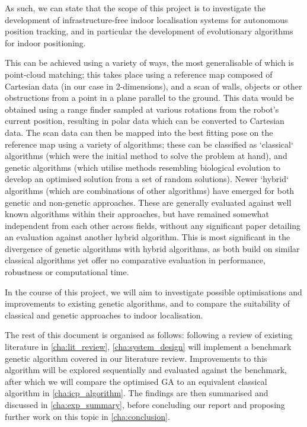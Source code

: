 \documentclass[authoryearcitations]{UoYCSproject}
\begin{document}
As such, we can state that the scope of this project is to investigate the development of infrastructure-free indoor localisation systems for autonomous position tracking, and in particular the development of evolutionary algorithms for indoor positioning.
\newline

This can be achieved using a variety of ways, the most generalisable of which is point-cloud matching; this takes place using a reference map composed of Cartesian data (in our case in 2-dimensions), and a scan of walls, objects or other obstructions from a point in a plane parallel to the ground. This data would be obtained using a range finder sampled at various rotations from the robot's current position, resulting in polar data which can be converted to Cartesian data. The scan data can then be mapped into the best fitting pose on the reference map using a variety of algorithms; these can be classified as `classical` algorithms (which were the initial method to solve the problem at hand), and genetic algorithms (which utilise methods resembling biological evolution to develop an optimised solution from a set of random solutions). Newer `hybrid` algorithms (which are combinations of other algorithms) have emerged for both genetic and non-genetic approaches. These are generally evaluated against well known algorithms within their approaches, but have remained somewhat independent from each other across fields, without any significant paper detailing an evaluation against another hybrid algorithm. This is most significant in the divergence of genetic algorithms with hybrid algorithms, as both build on similar classical algorithms yet offer no comparative evaluation in performance, robustness or computational time.\newline

In the course of this project, we will aim to investigate possible optimisations and improvements to existing genetic algorithms, and to compare the suitability of classical and genetic approaches to indoor localisation. \newline

The rest of this document is organised as follows: following a review of existing literature in \autoref{cha:lit_review}, \autoref{cha:system_design} will implement a benchmark genetic algorithm covered in our literature review. Improvements to this algorithm will be explored sequentially and evaluated against the benchmark, after which we will compare the optimised GA to an equivalent classical algorithm in \autoref{cha:icp_algorithm}. The findings are then summarised and discussed in \autoref{cha:exp_summary}, before concluding our report and proposing further work on this topic in \autoref{cha:conclusion}.
\end{document}
